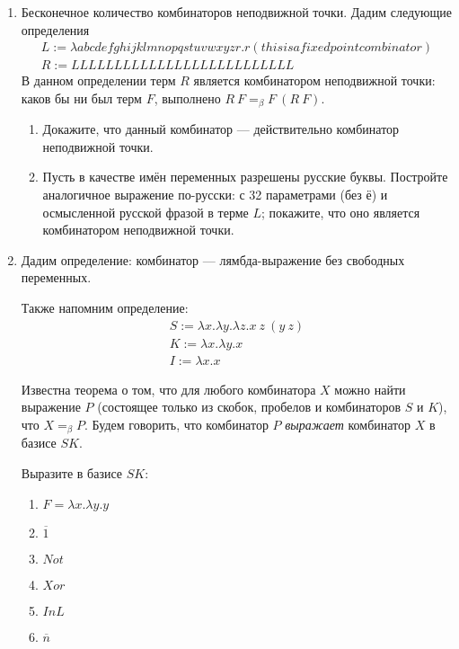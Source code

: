 \begin{enumerate}
    \item Бесконечное количество комбинаторов неподвижной точки. Дадим следующие определения
          $$\begin{array}{l}
                  L := \lambda abcdefghijklmnopqstuvwxyzr.r(thisisafixedpointcombinator) \\
                  R := LLLLLLLLLLLLLLLLLLLLLLLLLL\end{array}$$
          В данном определении терм $R$ является комбинатором неподвижной точки: каков бы ни был терм
          $F$, выполнено $R\ F =_\beta F\ (R\ F)$.
          \begin{enumerate}
              \item Докажите, что данный комбинатор --- действительно комбинатор неподвижной точки.
              \item Пусть в качестве имён переменных разрешены русские буквы. Постройте аналогичное выражение
                    по-русски: с 32 параметрами (без ё) и осмысленной русской фразой в терме $L$; покажите, что оно является
                    комбинатором неподвижной точки.
          \end{enumerate}

    \item Дадим определение: комбинатор --- лямбда-выражение без свободных переменных.

          Также напомним определение:
          $$\begin{array}{l}
                  S := \lambda x.\lambda y.\lambda z.x\ z\ (y\ z) \\
                  K := \lambda x.\lambda y.x                      \\
                  I := \lambda x.x
              \end{array}$$

          Известна теорема о том, что для любого комбинатора $X$ можно найти выражение $P$
          (состоящее только из скобок, пробелов и комбинаторов $S$ и $K$), что $X =_\beta P$.
          Будем говорить, что комбинатор $P$ \emph{выражает} комбинатор $X$ в базисе $SK$.

          Выразите в базисе $SK$:
          \begin{enumerate}
              \item $F = \lambda x.\lambda y.y$
              \item $\overline{1}$
              \item $Not$
              \item $Xor$
              \item $InL$
              \item $\overline{n}$
          \end{enumerate}

\end{enumerate}


